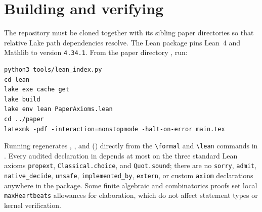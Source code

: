\section{Building and verifying}\label{sec:verification}

The repository must be cloned together with its sibling paper directories so that relative Lake
path dependencies resolve. The Lean package pins Lean~4 and Mathlib to version \texttt{4.34.1}.
From the paper directory
, run:
\begin{verbatim}
python3 tools/lean_index.py
cd lean
lake exe cache get
lake build
lake env lean PaperAxioms.lean
cd ../paper
latexmk -pdf -interaction=nonstopmode -halt-on-error main.tex
\end{verbatim}
Running   regenerates
, , and
 () directly from the \verb|\formal| and
\verb|\lean| commands in . Every audited declaration in  depends at most on the three standard Lean axioms
\texttt{propext}, \texttt{Classical.choice}, and \texttt{Quot.sound}; there are no \texttt{sorry},
\texttt{admit}, \texttt{native\_decide}, \texttt{unsafe}, \texttt{implemented\_by},
\texttt{extern}, or custom \texttt{axiom} declarations anywhere in the package. Some finite algebraic
and combinatorics proofs set local \texttt{maxHeartbeats} allowances for elaboration, which do not
affect statement types or kernel verification.
